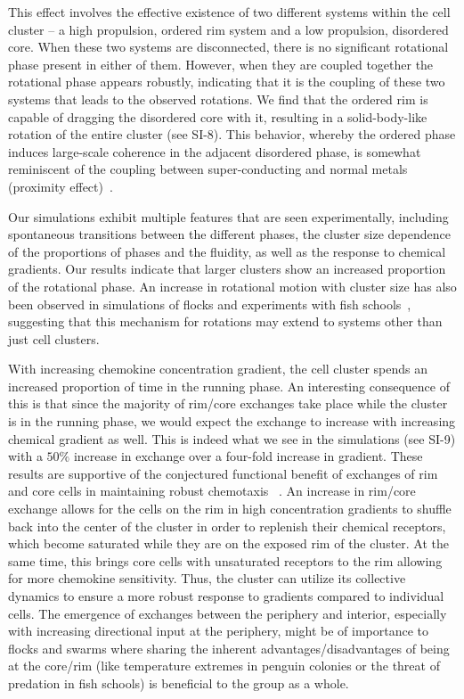 \documentclass{article}
\begin{document}
This effect involves the effective existence of two different systems within the cell cluster -- a high propulsion, ordered rim system and a low propulsion, disordered core. When these two systems are disconnected, there is no significant rotational phase present in either of them. However, when they are coupled together the rotational phase appears robustly, indicating that it is the coupling of these two systems that leads to the observed rotations. We find that the ordered rim is capable of dragging the disordered core with it, resulting in a solid-body-like rotation of the entire cluster (see SI-8). This behavior, whereby the ordered phase induces large-scale coherence in the adjacent disordered phase, is somewhat reminiscent of the coupling between super-conducting and normal metals (proximity effect)~\cite{Tinkham1996}.

Our simulations exhibit multiple features that are seen experimentally, including spontaneous transitions between the different phases, the cluster size dependence of the proportions of phases and the fluidity, as well as the response to chemical gradients. Our results indicate that larger clusters show an increased proportion of the rotational phase. An increase in rotational motion with cluster size has also been observed in simulations of flocks and experiments with fish schools~\cite{Tunstrom2013a}, suggesting that this mechanism for rotations may extend to systems other than just cell clusters. 

With increasing chemokine concentration gradient, the cell cluster spends an increased proportion of time in the running phase. An interesting consequence of this is that since the majority of rim/core exchanges take place while the cluster is in the running phase, we would expect the exchange to increase with increasing chemical gradient as well.  This is indeed what we see in the simulations (see SI-9) with a $50\%$ increase in exchange over a four-fold increase in gradient. These results are supportive of the conjectured functional benefit of exchanges of rim and core cells in maintaining robust chemotaxis ~\cite{Malet-Engra2014}.  An increase in rim/core exchange allows for the cells on the rim in high concentration gradients to shuffle back into the center of the cluster in order to replenish their chemical receptors, which become saturated while they are on the exposed rim of the cluster. At the same time, this brings core cells with unsaturated receptors to the rim allowing for more chemokine sensitivity. Thus, the cluster can utilize its collective dynamics to ensure a more robust response to gradients compared to individual cells. The emergence of exchanges between the periphery and interior, especially with increasing directional input at the periphery, might be of importance to flocks and swarms where sharing the inherent advantages/disadvantages of being at the core/rim (like temperature extremes in penguin colonies or the threat of predation in fish schools) is beneficial to the group as a whole.
\end{document}
